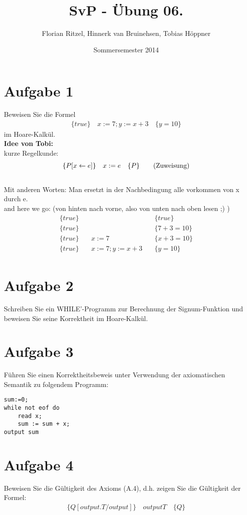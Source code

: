 \documentclass[ngerman,a4paper]{report}
\author{Florian Ritzel, Hinnerk van Bruinehsen, Tobias Höppner}
\title{SvP - Übung 06. }
\date{Sommersemester 2014}
\renewcommand{\maketitle}{}
\begin{document}
\maketitle
\section*{Aufgabe 1}
Beweisen Sie die Formel
\begin{align*}
\{true\}\quad
x:=7;y:=x+3\quad
\{y=10\}
\end{align*}
im Hoare-Kalkül.\\
\textbf{Idee von Tobi:}\\
kurze Regelkunde:
\begin{align}
\{P[x\leftarrow e]	\}\quad	x:=e 	\quad						\{P\}\tag{Zuweisung}\\
\notag
\end{align}
Mit anderen Worten: Man ersetzt in der Nachbedingung alle vorkommen von x durch e.\\
and here we go: (von hinten nach vorne, also von unten nach oben lesen ;) )
\begin{align*}
\{true\}\quad & 			\quad &\{true\} \\
\{true\}\quad &			\quad &\{7+3=10\} \tag{Zuweisung}\\
\{true\}\quad &	x:=7		\quad &\{x+3=10\} \tag{Zuweisung}\\
\{true\}\quad &	x:=7;y:=x+3		\quad &\{y=10\}\\
\end{align*}
\section*{Aufgabe 2}
Schreiben Sie ein WHILE'-Programm zur Berechnung der Signum-Funktion und beweisen Sie seine Korrektheit im Hoare-Kalkül.\\
\section*{Aufgabe 3}
Führen Sie einen Korrektheitsbeweis unter Verwendung der axiomatischen Semantik zu folgendem Programm:\\
\begin{lstlisting}
sum:=0;
while not eof do
	read x;
	sum := sum + x;
output sum
\end{lstlisting}
\section*{Aufgabe 4}
Beweisen Sie die Gültigkeit des Axioms (A.4), d.h. zeigen Sie die Gültigkeit der Formel:
\begin{align*}
\{Q[output.T/output]\}\quad
output T\quad
\{Q\}
\end{align*}
\end{document}
